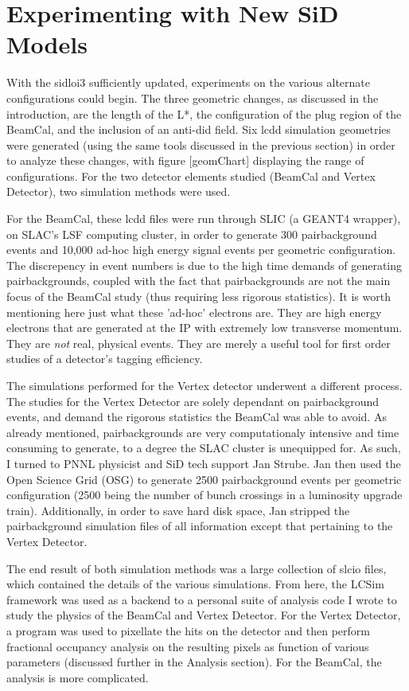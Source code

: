 \documentclass{report}
\begin{document}
        \section{Experimenting with New SiD Models}

            With the sidloi3 sufficiently updated, experiments on the various alternate configurations could begin. The three geometric changes, as discussed in the introduction, are the length of the L*, the configuration of the plug region of the BeamCal, and the inclusion of an anti-did field. Six lcdd simulation geometries were generated (using the same tools discussed in the previous section) in order to analyze these changes, with figure [geomChart] displaying the range of configurations. For the two detector elements studied (BeamCal and Vertex Detector), two simulation methods were used. 
            
            For the BeamCal, these lcdd files were run through SLIC (a GEANT4 wrapper), on SLAC's LSF computing cluster, in order to generate 300 pairbackground events and 10,000 ad-hoc high energy signal events per geometric configuration. The discrepency in event numbers is due to the high time demands of generating pairbackgrounds, coupled with the fact that pairbackgrounds are not the main focus of the BeamCal study (thus requiring less rigorous statistics). It is worth mentioning here just what these 'ad-hoc' electrons are. They are high energy electrons that are generated at the IP with extremely low transverse momentum. They are \textit{not} real, physical events. They are merely a useful tool for first order studies of a detector's tagging efficiency.

            The simulations performed for the Vertex detector underwent a different process. The studies for the Vertex Detector are solely dependant on pairbackground events, and demand the rigorous statistics the BeamCal was able to avoid. As already mentioned, pairbackgrounds are very computationaly intensive and time consuming to generate, to a degree the SLAC cluster is unequipped for. As such, I turned to PNNL physicist and SiD tech support Jan Strube. Jan then used the Open Science Grid (OSG) to generate 2500 pairbackground events per geometric configuration (2500 being the number of bunch crossings in a luminosity upgrade train). Additionally, in order to save hard disk space, Jan stripped the pairbackground simulation files of all information except that pertaining to the Vertex Detector. 

            The end result of both simulation methods was a large collection of slcio files, which contained the details of the various simulations. From here, the LCSim framework was used as a backend to a personal suite of analysis code I wrote to study the physics of the BeamCal and Vertex Detector. For the Vertex Detector, a program was used to pixellate the hits on the detector and then perform fractional occupancy analysis on the resulting pixels as function of various parameters (discussed further in the Analysis section). For the BeamCal, the analysis is more complicated.
            
\end{document}
